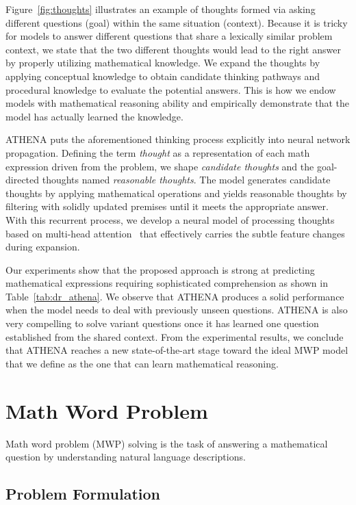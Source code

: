 \documentclass[11pt]{article}
\newcommand{\1}{\mathbb{1}}
\begin{document}
Figure~\ref{fig:thoughts} illustrates an example of thoughts formed via asking different questions (goal) within the same situation (context).
Because it is tricky for models to answer different questions that share a lexically similar problem context, we state that the two different thoughts would lead to the right answer by properly utilizing mathematical knowledge.
We expand the thoughts by applying conceptual knowledge to obtain candidate thinking pathways and procedural knowledge to evaluate the potential answers.
This is how we endow models with mathematical reasoning ability and empirically demonstrate that the model has actually learned the knowledge.

ATHENA puts the aforementioned thinking process explicitly into neural network propagation.
Defining the term \textit{thought} as a representation of each math expression driven from the problem, we shape \textit{candidate thoughts} and the goal-directed thoughts named \textit{reasonable thoughts}.
The model generates candidate thoughts by applying mathematical operations and yields reasonable thoughts by filtering with solidly updated premises until it meets the appropriate answer.
With this recurrent process, we develop a neural model of processing thoughts based on multi-head attention~\citep{vaswani-etal-2017-attention} that effectively carries the subtle feature changes during expansion.

Our experiments show that the proposed approach is strong at predicting mathematical expressions requiring sophisticated comprehension as shown in Table~\ref{tab:dr_athena}.
We observe that ATHENA produces a solid performance when the model needs to deal with previously unseen questions.
ATHENA is also very compelling to solve variant questions once it has learned one question established from the shared context.
From the experimental results, we conclude that ATHENA reaches a new state-of-the-art stage toward the ideal MWP model that we define as the one that can learn mathematical reasoning.

\section{Math Word Problem}

Math word problem (MWP) solving is the task of answering a mathematical question by understanding natural language descriptions.

\subsection{Problem Formulation}
\end{document}

